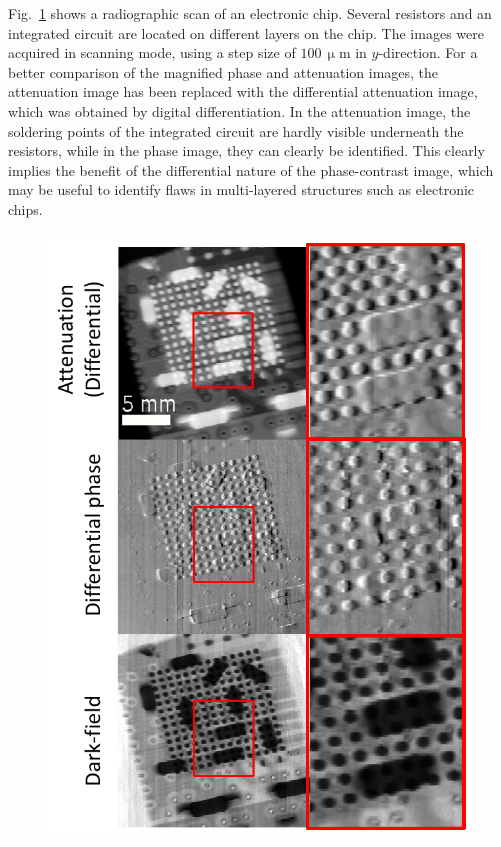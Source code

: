 \documentclass[aip,apl,amsmath,amssymb,floatfix,reprint,a4paper]{revtex4-1}
\newcommand{\unit}[1]{\ensuremath{\, \mathrm{#1}}}
\begin{document}
Fig.~\ref{Fig:img_chip} shows a radiographic scan of an electronic chip. Several resistors and an integrated circuit are located on different layers on the chip. The images were acquired in scanning mode, using a step size of $100 \unit{\upmu m}$ in $y$-direction. For a better comparison of the magnified phase and attenuation images, the attenuation image has been replaced with the differential attenuation image, which was obtained by digital differentiation. In the attenuation image, the soldering points of the integrated circuit are hardly visible underneath the resistors, while in the phase image, they can clearly be identified. This clearly implies the benefit of the differential nature of the phase-contrast image, which may be useful to identify flaws in multi-layered structures such as electronic chips.
\begin{figure} [ht]
  \includegraphics[width = \linewidth]{figures/img_chip_dabs.pdf}
  \caption{}
  \label{Fig:img_chip}
\end{figure}
\end{document}
